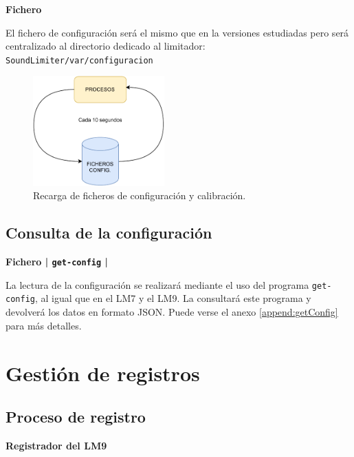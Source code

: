 \begin{flushright}
\textbf{Fichero}
\end{flushright}

El fichero de configuración será el mismo que en la versiones estudiadas pero será centralizado al directorio dedicado al limitador: \texttt{SoundLimiter/var/configuracion}

\begin{figure}[h]
    \centering
    \includegraphics[width=0.45\textwidth]{figuras/lms-conf-reload.pdf}
    \caption{Recarga de ficheros de configuración y calibración.}
    \label{fig:lms-conf-reload}
\end{figure}

\subsection{Consulta de la configuración}

\begin{flushright}
\textbf{Fichero | \texttt{get-config} | }
\end{flushright}

La lectura de la configuración se realizará mediante el uso del programa \texttt{get-config}, al igual que en el \acrshort{LM7} y el \acrshort{LM9}. La  consultará este programa y devolverá los datos en formato \acrshort{JSON}. Puede verse el anexo \ref{append:getConfig} para más detalles.

\section{Gestión de registros}

\subsection{Proceso de registro}

\begin{flushright}
\textbf{Registrador del \acrshort{LM9}}
\end{flushright}

